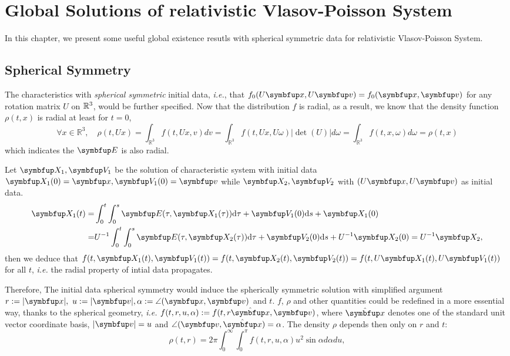 \chapter{Global Solutions of relativistic Vlasov-Poisson System}
\label{cha:global-RVP}

In this chapter, we present some useful global existence resutls with spherical symmetric data for relativistic Vlasov-Poisson System.

\section{Spherical Symmetry}
The characteristics with \textit{spherical symmetric} initial data, \textit{i.e.}, that $f_0(U\vx,U\vv)=f_0(\vx,\vv)$ for any rotation matrix $U$ on ${\mathbb{R}}^{3}$, would be further specified. 
Now that the distribution $f$ is radial, as a result, we know that the density function $\rho(t, x)$ is radial at least for $t=0$,
\[
\forall x \in \mathbb{R}^{3}, \quad \rho(t, U x)=\int_{\mathbb{R}^{3}} f(t, Ux, v) d v=\int_{\mathbb{R}^{3}} f(t, U x, U \omega)|\operatorname{det}(U)| d \omega=\int_{\mathbb{R}^{3}} f(t, x, \omega) d \omega=\rho(t, x)
\]
which indicates the $\vE$ is also radial.


Let $\vect{X}_1, \vect{V}_1$ be the solution of characteristic system with initial data $\vect{X}_1 (0)= \vx, \vect{V}_1 (0)= \vv$ while $\vect{X}_2, \vect{V}_2$ with $(U\vx,U\vv)$ as initial data. 
$$
\begin{aligned}
\vect{X}_1(t) = &\int_0^t  \int_0^s \vect{E}(\tau, \vect{X}_1(\tau))\mathrm{d} \tau +\vect{V}_1(0)\mathrm{d} s +\vect{X}_1(0)\\ =& U^{-1}\int_0^t  \int_0^s \vect{E}(\tau, \vect{X}_2(\tau)) \mathrm{d} \tau +\vect{V}_2(0) \mathrm{d} s +U^{-1}\vect{X}_2(0) = U^{-1}\vect{X}_2,
\end{aligned}$$
 then we deduce that $f(t,\vect{X}_1(t), \vect{V}_1(t)) = f(t,\vect{X}_2(t), \vect{V}_2(t)) =  f(t,U\vect{X}_1(t), U\vect{V}_1(t))$ for all $t$, \textit{i.e.} the radial property of intial data propagates. 

Therefore, The initial data spherical symmetry would induce the spherically symmetric solution with simplified argument $r:=|\vx|,~ u:=|\vv|,\alpha:=\angle(\vx,\vv)$ and $t$. $f$, $\rho$ and other quantities could be redefined in a more essential way, thanks to the spherical geometry,  \textit{i.e.} $f(t,r,u,\alpha) := f(t, r\hat{\vect{x}} , \vv)$, where $\hat{\vx}$ denotes one of the standard unit vector coordinate basis, $|\vv| = u$ and $ \angle(\vv, \hat{\vect{x}})=\alpha$. The density $\rho$ depends then only on $r$ and $t$: 
\begin{equation}
    \rho( t,r)=2 \pi \int_{0}^{\infty} \int_{0}^{\pi} f(t, r, u, \alpha) u^{2} \sin \alpha d \alpha d u,
\end{equation}


